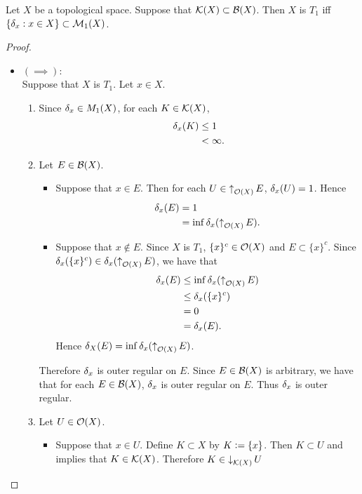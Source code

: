\documentclass{book}
\begin{document}
	\begin{ex}  
		Let $X$ be a topological space. Suppose that $\mathcal{K}(X) \subset \mathcal{B}(X)$. Then $X$ is $T_1$ iff $\{\delta_x:x \in X\} \subset \mathcal{M}_1(X)$.
	\end{ex}
	
	\begin{proof}\
		\begin{itemize}
			\item $(\implies)$: \\
			Suppose that $X$ is $T_1$. Let $x \in X$.
			\begin{enumerate}
				\item Since $\delta_x \in M_1(X)$, for each $K \in \mathcal{K}(X)$, 
				\begin{align*}
					\delta_x(K)
					& \leq 1 \\
					& < \infty.
				\end{align*}
				\item Let $E \in \mathcal{B}(X)$. 
				\begin{itemize}
					\item Suppose that $x \in E$. Then for each $U \in \operatorname{\uparrow}_{\mathcal{O}(X)} E$, $\delta_x(U) = 1$. Hence 
					\begin{align*}
						\delta_x(E)
						& = 1 \\
						& = \inf \delta_x(\operatorname{\uparrow}_{\mathcal{O}(X)} E).
					\end{align*}
					\item Suppose that $x \not \in E$. Since $X$ is $T_1$, $\{x\}^c \in \mathcal{O}(X)$ and $E \subset \{x\}^c$. Since $\delta_x(\{x\}^c) \in \delta_x(\operatorname{\uparrow}_{\mathcal{O}(X)} E)$, we have that
					\begin{align*}
						\delta_x(E)
						& \leq \inf \delta_x(\operatorname{\uparrow}_{\mathcal{O}(X)} E) \\
						& \leq \delta_x(\{x\}^c) \\
						& = 0 \\
						& = \delta_x(E).
					\end{align*}
					Hence $\delta_X(E) = \inf \delta_x(\operatorname{\uparrow}_{\mathcal{O}(X)} E)$.
				\end{itemize}
				Therefore $\delta_x$ is outer regular on $E$. Since $E \in \mathcal{B}(X)$ is arbitrary, we have that for each $E \in \mathcal{B}(X)$, $\delta_x$ is outer regular on $E$. Thus $\delta_x$ is outer regular. 
				\item Let $U \in \mathcal{O}(X)$. 
				\begin{itemize}
					\item Suppose that $x \in U$. Define $K \subset X$ by $K \vcentcolon= \{x\}$. Then $K \subset U$ and  implies that $K \in \mathcal{K}(X)$. Therefore $K \in \operatorname{\downarrow}_{\mathcal{K}(X)} U$

\end{itemize}
\end{enumerate}
\end{itemize}
\end{proof}
\end{document}
